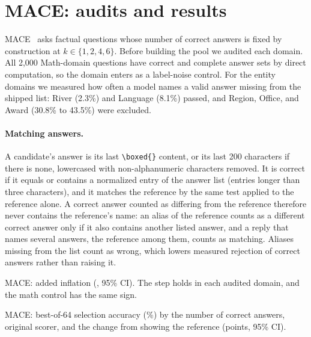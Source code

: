 \FloatBarrier
\section{\textsc{MACE}: audits and results}
\label{app:mace}

\textsc{MACE}~\citep{mace2026} asks factual questions whose number of correct answers is fixed by construction at $k \in \{1,2,4,6\}$. Before building the pool we audited each domain. All 2,000 Math-domain questions have correct and complete answer sets by direct computation, so the domain enters as a label-noise control. For the entity domains we measured how often a model names a valid answer missing from the shipped list: River (2.3\%) and Language (8.1\%) passed, and Region, Office, and Award (30.8\% to 43.5\%) were excluded.

\paragraph{Matching answers.} A candidate's answer is its last \texttt{\textbackslash boxed\{\}} content, or its last 200 characters if there is none, lowercased with non-alphanumeric characters removed. It is correct if it equals or contains a normalized entry of the answer list (entries longer than three characters), and it matches the reference by the same test applied to the reference alone. A correct answer counted as differing from the reference therefore never contains the reference's name: an alias of the reference counts as a different correct answer only if it also contains another listed answer, and a reply that names several answers, the reference among them, counts as matching. Aliases missing from the list count as wrong, which lowers measured rejection of correct answers rather than raising it.

\begin{table}[htbp]
\centering
\caption{\textsc{MACE}: added inflation (\sd, 95\% CI). The step holds in each audited domain, and the math control has the same sign.\pre}
\label{tab:mace}
\footnotesize
\begin{adjustbox}{max width=\linewidth}\end{adjustbox}

\end{table}

\begin{table}[htbp]
\centering
\caption{\textsc{MACE}: best-of-64 selection accuracy (\%) by the number of correct answers, original scorer, and the change from showing the reference (points, 95\% CI).\ph}
\label{tab:mace-by-k}
\footnotesize
\begin{adjustbox}{max width=\linewidth}\end{adjustbox}

\end{table}

